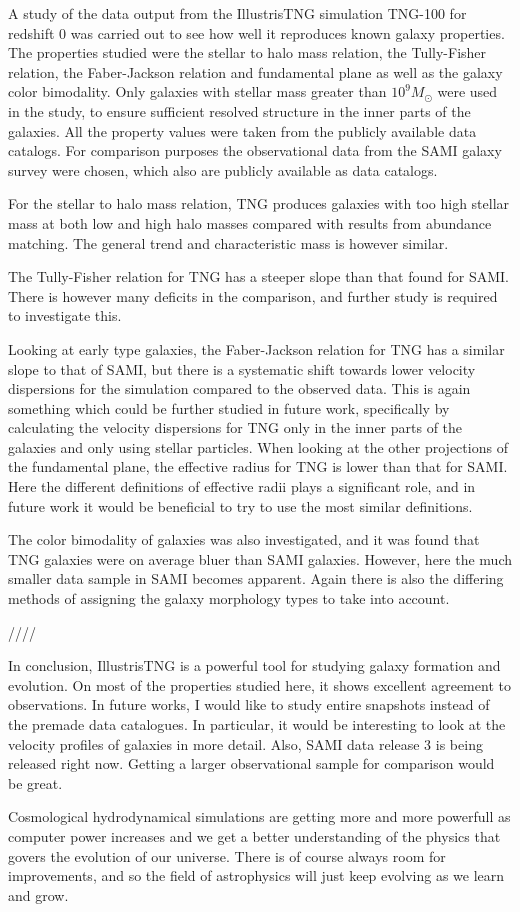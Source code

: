 
A study of the data output from the IllustrisTNG simulation TNG-100 for redshift 0 was carried out to see how well it reproduces known galaxy properties. The properties studied were the stellar to halo mass relation, the Tully-Fisher relation, the Faber-Jackson relation and fundamental plane as well as the galaxy color bimodality. Only galaxies with stellar mass greater than $10^9 M_{\odot}$ were used in the study, to ensure sufficient resolved structure in the inner parts of the galaxies. All the property values were taken from the publicly available data catalogs. For comparison purposes the observational data from the SAMI galaxy survey were chosen, which also are publicly available as data catalogs.  

For the stellar to halo mass relation, TNG produces galaxies with too high stellar mass at both low and high halo masses compared with results from abundance matching. The general trend and characteristic mass is however similar. 

The Tully-Fisher relation for TNG has a steeper slope than that found for SAMI. There is however many deficits in the comparison, and further study is required to investigate this. 

Looking at early type galaxies, the Faber-Jackson relation for TNG has a similar slope to that of SAMI, but there is a systematic shift towards lower velocity dispersions for the simulation compared to the observed data. This is again something which could be further studied in future work, specifically by calculating the velocity dispersions for TNG only in the inner parts of the galaxies and only using stellar particles. When looking at the other projections of the fundamental plane, the effective radius for TNG is lower than that for SAMI. Here the different definitions of effective radii plays a significant role, and in future work it would be beneficial to try to use the most similar definitions.

The color bimodality of galaxies was also investigated, and it was found that TNG galaxies were on average bluer than SAMI galaxies. However, here the much smaller data sample in SAMI becomes apparent. Again there is also the differing methods of assigning the galaxy morphology types to take into account.

////

In conclusion, IllustrisTNG is a powerful tool for studying galaxy formation and evolution. On most of the properties studied here, it shows excellent agreement to observations. 
In future works, I would like to study entire snapshots instead of the premade data catalogues. In particular, it would be interesting to look at the velocity profiles of galaxies in more detail. Also, SAMI data release 3 is being released right now. Getting a larger observational sample for comparison would be great.

Cosmological hydrodynamical simulations are getting more and more powerfull as computer power increases and we get a better understanding of the physics that govers the evolution of our universe. There is of course always room for improvements, and so the field of astrophysics will just keep evolving as we learn and grow.